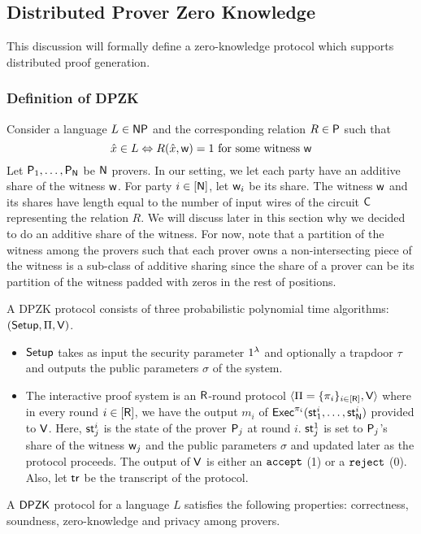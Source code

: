 \subsection{Distributed Prover Zero Knowledge}
This discussion will formally define a zero-knowledge protocol which supports distributed proof generation.
\subsubsection{Definition of DPZK}
Consider a language $L \in \mathsf{NP}$ and the corresponding relation $R \in \mathsf{P}$ such that
\[
\hat{x} \in L \Leftrightarrow R(\hat{x}, \mathsf{w})=1 \text{ for some witness } \mathsf{w}
\]
Let $\mathsf{P}_1, \ldots, \mathsf{P}_{\mathsf{N}}$ be $\mathsf{N}$ provers. In our setting, we let each party have an additive share of the witness $\mathsf{w}$. For party $i \in [\mathsf{N}]$, let $\mathsf{w}_i$ be its share.  The witness $\mathsf{w}$ and its shares have length equal to the number of input wires of the circuit $\mathsf{C}$ representing the relation $R$. We will discuss later in this section why we decided to do an additive share of the witness. For now, note that a partition of the witness among the provers such that each prover owns a non-intersecting piece of the witness is a sub-class of additive sharing since the share of a prover can be its partition of the witness padded with zeros in the rest of positions.


A DPZK protocol consists of three probabilistic polynomial time algorithms: $(\mathsf{Setup}, \Pi, \mathsf{V})$. 
\begin{itemize}
\item $\mathsf{Setup}$ takes as input the security parameter $1^{\lambda}$ and optionally a trapdoor $\tau$ and outputs the public parameters $\sigma$ of the system.
\item The interactive proof system is an $\mathsf{R}$-round protocol $\langle \Pi = \{\pi_i\}_{i \in [\mathsf{R}]}, \mathsf{V} \rangle$ where in every round $i \in [\mathsf{R}]$, we have the output $m_i$ of $\mathsf{Exec}^{\pi_i}(\mathsf{st}^i_1, \ldots, \mathsf{st}^i_{\mathsf{N}})$ provided to $\mathsf{V}$. Here, $\mathsf{st}^i_j$ is the state of the prover $\mathsf{P}_j$ at round $i$. $\mathsf{st}^1_j$ is set to $\mathsf{P}_j$'s share of the witness $\mathsf{w}_j$ and the public parameters $\sigma$ and updated later as the protocol proceeds. The output of $\mathsf{V}$ is either an $\tt accept$ (1) or a $\tt{reject}$ (0). Also, let $\mathsf{tr}$ be the transcript of the protocol.
\end{itemize}
A $\mathsf{DPZK}$ protocol for a language $L$ satisfies the following properties: 
correctness, soundness, zero-knowledge and privacy among provers.
